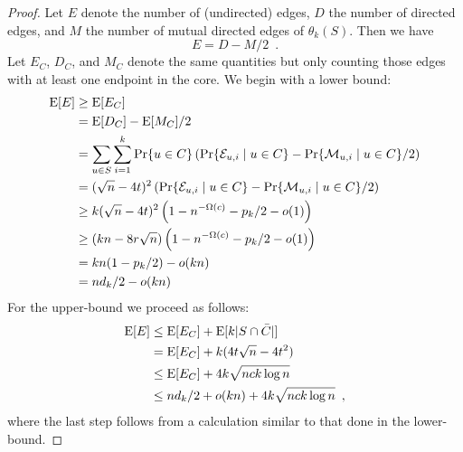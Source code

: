 \documentclass{patmorin}
\begin{document}
\begin{proof}
  Let $E$ denote the number of (undirected) edges, $D$
  the number of directed edges, and $M$ the number of mutual directed edges
  of $\theta_k(S)$.   Then we have
  \[  
     E = D - M/2 \enspace . 
  \]
  Let $E_C$, $D_C$, and $M_C$ denote the same quantities but only
  counting those edges with at least one endpoint in the core.
  We begin with a lower bound:
  \begin{align*}
   \mathrm{E}[E] & \ge \mathrm{E}[E_C] \\
         & = \mathrm{E}[D_C] - \mathrm{E}[M_C]/2 \\
         & = \sum_{u\in S}\sum_{i=1}^k\Pr\{u\in C\}
              \left(\Pr\{\mathcal{E}_{u,i}\mid u\in C\}
                - \Pr\{\mathcal{M}_{u,i}\mid u\in C\}/2 \right) \\
        & = (\sqrt{n}-4t)^2
              \left(\Pr\{\mathcal{E}_{u,i}\mid u\in C\}
                - \Pr\{\mathcal{M}_{u,i}\mid u\in C\}/2 \right) \\
        & \ge k(\sqrt{n}-4t)^2
              \left(1-n^{-\Omega(c)} - p_k/2 - o(1)\right) \\
        & \ge (kn - 8r\sqrt{n})
              \left(1-n^{-\Omega(c)} - p_k/2 - o(1)\right) \\
        & = kn(1-p_k/2) - o(kn) \\
        & = nd_k/2 - o(kn)
  \end{align*} 
  For the upper-bound we proceed as follows:
  \begin{align*}
     \mathrm{E}[E] & \le \mathrm{E}[E_C] + \mathrm{E}[k|S\cap\bar{C}|] \\
           & = \mathrm{E}[E_C] + k(4t\sqrt{n}-4t^2) \\
           & \le \mathrm{E}[E_C] + 4k\sqrt{nck\log n} \\
           & \le nd_k/2 + o(kn) + 4k\sqrt{nck\log n} \enspace ,
  \end{align*}
  where the last step follows from a calculation similar to that
  done in the lower-bound.
%
%
%
\end{proof}
\end{document}
